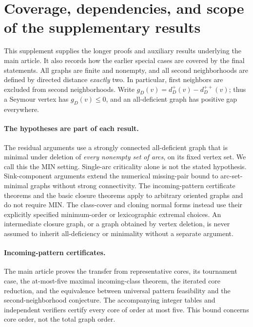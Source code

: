 \section{Coverage, dependencies, and scope of the supplementary results}
\label{sec:supplement-coverage}

This supplement supplies the longer proofs and auxiliary results underlying
the main article. It also records how the earlier special cases are covered
by the final statements. All graphs are finite and nonempty, and all second
neighborhoods are defined by directed distance \emph{exactly} two. In
particular, first neighbors are excluded from second neighborhoods. Write
\(g_D(v)=d_D^+(v)-d_D^{++}(v)\); thus a Seymour vertex has
\(g_D(v)\le0\), and an all-deficient graph has positive gap everywhere.

\paragraph{The hypotheses are part of each result.}
The residual arguments use a strongly connected all-deficient graph that
is minimal under deletion of \emph{every nonempty set of arcs}, on its fixed
vertex set. We call this the MIN setting. Single-arc criticality alone is
not the stated hypothesis. Sink-component arguments extend the numerical
missing-pair bound to arc-set-minimal graphs without strong connectivity.
The incoming-pattern certificate theorems and the basic closure theorems
apply to arbitrary oriented graphs and do not require MIN. The class-cover
and cloning normal forms instead use their explicitly specified
minimum-order or lexicographic extremal choices. An intermediate closure
graph, or a graph obtained by vertex deletion, is never assumed to inherit
all-deficiency or minimality without a separate argument.

\paragraph{Incoming-pattern certificates.}
The main article proves the transfer from representative cores, its
tournament case, the at-most-five maximal incoming-class theorem, the
iterated core reduction, and the equivalence between universal pattern
feasibility and the second-neighborhood conjecture. The accompanying
integer tables and independent verifiers certify every core of order at
most five. This bound concerns core order, not the total graph order.

